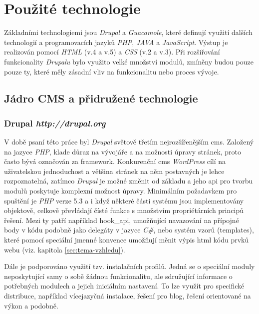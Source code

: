 \section{Použité technologie}
\label{sec:technologies}

Základními technologiemi jsou \emph{Drupal} a \emph{Guacamole}, které definují využití dalších technologií a programovacích jazyků \emph{PHP}, \emph{JAVA} a \emph{JavaScript}. Výstup je realizován pomocí \emph{HTML} (v.4 a v.5) a \emph{CSS} (v.2 a v.3). Při rozšiřování funkcionality \emph{Drupalu} bylo využito velké množství modulů, zmíněny budou pouze pouze ty, které měly zásadní vliv na funkcionalitu nebo proces vývoje.

\subsection{Jádro CMS a přidružené technologie}

\subsubsection*{\textbf{Drupal} \hfill \emph{http://drupal.org}} 
\label{subsec:drupal}
V době psaní této práce byl \emph{Drupal} světově třetím nejrozšířenějším \gls{cms}\cite{website:cms-market-share}. Založený na jazyce \emph{PHP}, klade důraz na vývojáře a na možnosti úpravy stránek, proto často bývá označován za \gls{framework}. Konkurenční \gls{cms} \emph{WordPress} cílí na uživatelskou jednoduchost a většina stránek na něm postavných je lehce rozpoznatelná, zatímco \emph{Drupal} je možné změnit od základu a jeho \gls{api} pro tvorbu modulů poskytuje komplexní možnost úpravy. Minimálním požadavkem pro spuštění je \emph{PHP} verze 5.3 a i když některé části systému jsou implementovány objektově, celkově převládají čísté funkce s množstvím propriétárních principů řešení. Mezi ty patří například hook\_api, umožňující navazování na přípojné body v kódu podobně jako delegáty v jazyce \emph{C\#}, nebo systém vzorů (templates), které pomocí speciální jmenné konvence umožňují měnit výpis html kódu prvků webu (viz. kapitola \ref{sec:tema-vzhledu}).

Dále je podporováno využití tzv. instalačních profilů. Jedná se o speciální moduly neposkytující samy o sobě žádnou funkcionalitu, ale sdružující informace o potřebných modulech a jejich iniciálním nastavení. To lze využít pro specifické distribuce, například vícejazyčná instalace, řešení pro blog, řešení orientované na výkon a podobně.

